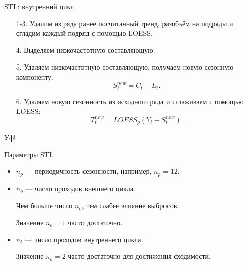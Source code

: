   \begin{frame}{STL: внутренний цикл}
    
    \begin{enumerate}[<+->]
    
      \item[1-3.] Удалим из ряда ранее посчитанный тренд, разобъём на подряды и 
      сгладим каждый подряд с помощью LOESS. 
      
      \item[4.] Выделяем низкочастотную составляющую.
      \item[5.] Удаляем низкочастотную составляющую, получаем \alert{новую} сезонную компоненту:
      \[
      S_t^{new} = C_t - L_t.  
      \]
      \item[6.] Удаляем новую сезонность из исходного ряда и сглаживаем с помощью LOESS:
      \[
      T_t^{new} = LOESS_{\rho}(Y_t - S_t^{new}).
      \]
      
    \end{enumerate}
    
    
    \end{frame}
    
  
    \begin{frame}

      \begin{center}
        Уф!
      \end{center}

    \end{frame}
  

\begin{frame}{Параметры STL}

  \begin{itemize}[<+->]
    \item $n_p$ — периодичность сезонности, например, $n_p=12$.
    \item $n_o$ — число проходов внешнего цикла. 
    
    Чем больше число $n_o$, тем слабее влияние выбросов.

    Значение $n_o = 1$ часто достаточно.
    \item $n_i$ — число проходов внутреннего цикла. 

    Значение $n_o = 2$ часто достаточно для достижения сходимости.
  \end{itemize}
    
\end{frame}

